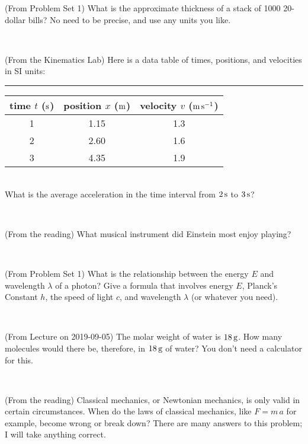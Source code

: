 \documentclass[12pt, letterpaper]{article}
\begin{document}
\begin{problem} (From Problem Set 1)
What is the approximate thickness of a stack of 1000 20-dollar bills?
No need to be precise, and use any units you like.
\end{problem}


\vfill ~

\begin{problem} (From the Kinematics Lab)
Here is a data table of times, positions, and velocities in SI units:\\
\rule{1.0in}{0pt}\begin{tabular}{c|c|c}
time $t$ ($\mathrm{s}$) & position $x$ ($\mathrm{m}$) & velocity $v$ ($\mathrm{m}\,\mathrm{s}^{-1}$) \\
\hline
1 & 1.15 & 1.3 \\
2 & 2.60 & 1.6 \\
3 & 4.35 & 1.9 \\
\hline
\end{tabular}\\
What is the average acceleration in the time interval from $2\,\mathrm{s}$ to $3\,\mathrm{s}$?
\end{problem}


\vfill ~


\clearpage


\begin{problem} (From the reading)
What musical instrument did Einstein most enjoy playing?
\end{problem}


\vfill ~

\begin{problem} (From Problem Set 1)
What is the relationship between the energy $E$ and wavelength
$\lambda$ of a photon? Give a formula that involves energy $E$,
Planck's Constant $h$, the speed of light $c$, and wavelength
$\lambda$ (or whatever you need).
\end{problem}

\vfill ~

\begin{problem} (From Lecture on 2019-09-05)
The molar weight of water is $18\,\mathrm{g}$. How many molecules would there
be, therefore, in $18\,\mathrm{g}$ of water? You don't need a calculator for
this.
\end{problem}


\vfill ~

\begin{problem} (From the reading)
Classical mechanics, or Newtonian mechanics, is only valid in certain
circumstances. When do the laws of classical mechanics, like $F =
m\,a$ for example, become wrong or break down? There are many answers
to this problem; I will take anything correct.
\end{problem}
\end{document}
